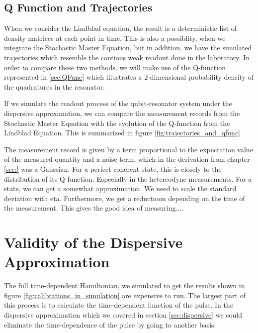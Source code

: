 \FloatBarrier

\subsection{Q Function and Trajectories}
When we consider the Lindblad equation, the result is a deterministic list of density matrices at each point in time. This is also a possiblity, when we integrate the Stochastic Master Equation, but in addition, we have the simulated trajectories which resemble the contious weak readout done in the laboratory. In order to compare these two methods, we will make use of the Q-function represented in \ref{sec:QFunc} which illustrates a 2-dimensional probability density of the quadratures in the resonator. 

If we simulate the readout process of the qubit-resonator system under the dispersive approximation, we can compare the measurement records from the Stochastic Master Equation with the evolution of the Q-function from the Lindblad Equation. This is summarized in figure \ref{fig:trajectories_and_qfunc}

\begin{figure*}[h]
    \centering
    \caption{asdfasdfasdf}
    \label{fig:trajectories_and_qfunc}
\end{figure*}

The measurement record is given by a term proportional to the expectation value of the measured quantity and a noise term, which in the derivation from chapter \ref{sec:} was a Gaussian. For a perfect coherent state, this is closely to the distribution of its Q function. Especially in the hetereodyne measurements. For a state, we can get a somewhat approximation. We need to scale the standard deviation with eta. Furthermore, we get a reductioon depending on the time of the measurement. This gives the good idea of measuring.... 


\section{Validity of the Dispersive Approximation}
The full time-dependent Hamiltonian, we simulated to get the results shown in figure \ref{fig:calibrations_in_simulation} are expensive to run. The largest part of this process is to calculate the time-dependent function of the pulse. In the dispersive approximation which we covered in section \ref{sec:dispersive} we could eliminate the time-dependence of the pulse by going to another basis.

